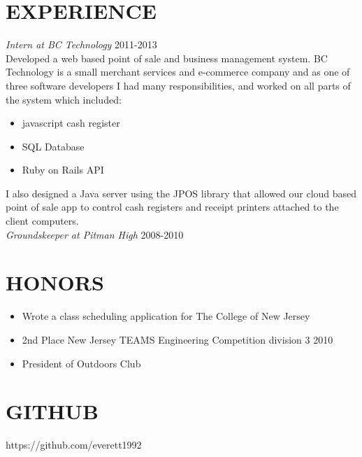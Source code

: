\documentclass[line, margin]{res}
\begin{document}
\begin{resume}
    \section{EXPERIENCE}
    \textit{Intern at BC Technology} \hfill 2011-2013 \\
    Developed a web based point of sale and business management system.
    BC Technology is a small merchant services and e-commerce company and as one of three software developers
    I had many responsibilities, and worked on all parts of the system which included:
    \begin{itemize}
      \item javascript cash register
      \item SQL Database
      \item Ruby on Rails API
    \end{itemize}
    I also designed a Java server using the JPOS library that allowed our cloud based point of sale app
    to control cash registers and receipt printers attached to the client computers. \\
    \textit{Groundskeeper at Pitman High} \hfill 2008-2010 \\
    \section{HONORS}
    \begin{itemize}
      \item Wrote a class scheduling application for The College of New Jersey
      \item 2nd Place New Jersey TEAMS Engineering Competition division 3 2010
      \item President of Outdoors Club
    \end{itemize}
    \section{GITHUB}
    https://github.com/everett1992
  \end{resume}
\end{document}
